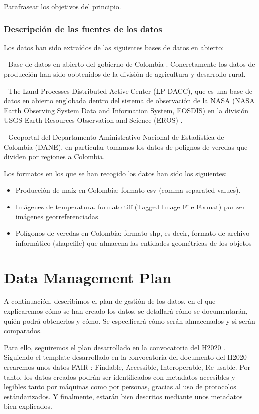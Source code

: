 \documentclass[12pt, spanish]{article}
\begin{document}
Parafrasear los objetivos del principio.

\subsubsection{Descripción de las fuentes de los datos}

Los datos han sido extraídos de las siguientes bases de datos en abierto: 

- Base de datos en abierto del gobierno de Colombia \cite{ref1}. Concretamente los datos de producción han sido oobtenidos de la división de agricultura y desarrollo rural.

- The Land Processes Distributed Active Center (LP DACC), que es una base de datos en abierto englobada dentro del sistema de observación de la NASA (NASA Earth Observing System Data and Information System, EOSDIS) en la división USGS Earth Resources Observation and Science (EROS) \cite{ref2}.

- Geoportal del Departamento Aministrativo Nacional de Estadística de Colombia (DANE), en particular tomamos los datos de polígnos de veredas que dividen por regiones a Colombia\cite{ref3}.

Los formatos en los que se han recogido los datos han sido los siguientes:
\begin{itemize}
    \item Producción de maíz en Colombia: formato csv (comma-separated values).
    \item Imágenes de temperatura: formato tiff (Tagged Image File Format) por ser imágenes georreferenciadas.
    \item Polígonos de veredas en Colombia: formato shp, es decir, formato de archivo informático (shapefile) que almacena las entidades geométricas de los objetos
\end{itemize}

\section{Data Management Plan}

A continuación, describimos el plan de gestión de los datos, en el que explicaremos cómo se han creado los datos, se detallará cómo se documentarán, quién podrá obtenerlos y cómo. Se especificará cómo serán almacenados y si serán comparados. 

Para ello, seguiremos el plan desarrollado en la convocatoria del H2020 \cite{ref6}. Siguiendo el template desarrollado en la convocatoria del documento del H2020 crearemos unos datos FAIR : Findable, Accessible, Interoperable, Re-usable. Por tanto, los datos creados podrán ser identificados con metadatos accesibles y legibles tanto por máquinas como por personas, gracias al uso de protocolos estándarizados. Y finalmente, estarán bien descritos mediante unos metadatos bien explicados. 
\end{document}
